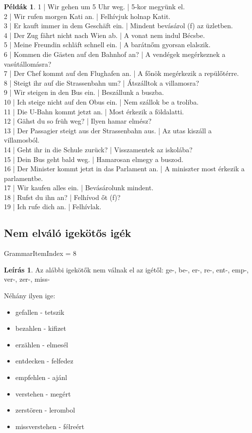 \documentclass{article}
\theoremstyle{definition}
\newtheorem*{exmp}{Példák}
\newtheorem*{desc}{Leírás}
\begin{document}
\begin{exmp}
1 | Wir gehen um 5 Uhr weg. | 5-kor megyünk el.\\
2 | Wir rufen morgen Kati an. | Felhívjuk holnap Katit.\\
3 | Er kauft immer in dem Geschäft ein. | Mindent bevásárol (f) az üzletben.\\
4 | Der Zug fährt nicht nach Wien ab. | A  vonat nem indul Bécsbe.\\
5 | Meine Freundin schläft schnell ein. | A barátnőm gyorsan elalszik.\\
6 | Kommen die Gästen auf den Bahnhof an? | A vendégek megérkeznek a vasútállomásra?\\
7 | Der Chef kommt auf den Flughafen an. | A főnök megérkezik a repülőtérre.\\
8 | Steigt ihr auf die Strassenbahn um? | Átszálltok a villamosra?\\
9 | Wir steigen in den Bus ein. | Beszállunk a buszba.\\
10 | Ich steige nicht auf den Obus ein. | Nem szállok be a troliba.\\
11 | Die U-Bahn kommt jetzt an. | Most érkezik a földalatti.\\
12 | Gähst du so früh weg? | Ilyen hamar elmész?\\
13 | Der Passagier steigt aus der Strassenbahn aus. | Az utas kiszáll a villamosból.\\
14 | Geht ihr in die Schule zurück? | Visszamentek az iskolába?\\
15 | Dein Bus geht bald weg. | Hamarosan elmegy a buszod.\\
16 | Der Minister kommt jetzt in das Parlament an. | A miniszter most érkezik a parlamentbe.\\
17 | Wir kaufen alles ein. | Bevásárolunk mindent.\\
18 | Rufst du ihn an? | Felhívod őt (f)?\\
19 | Ich rufe dich an. | Felhívlak.\\
\end{exmp}

\subsection{Nem elváló igekötős igék}

GrammarItemIndex = 8

\begin{desc}
Az alábbi igekötők nem válnak el az igétől:
ge-, be-, er-, re-, ent-, emp-, ver-, zer-, miss-

Néhány ilyen ige:
\begin{itemize}
\item gefallen - tetszik
\item bezahlen - kifizet
\item erzählen - elmesél
\item entdecken - felfedez
\item empfehlen - ajánl
\item verstehen - megért
\item zerstören - lerombol
\item missverstehen - félreért
\end{itemize}
\end{desc}
\end{document}
